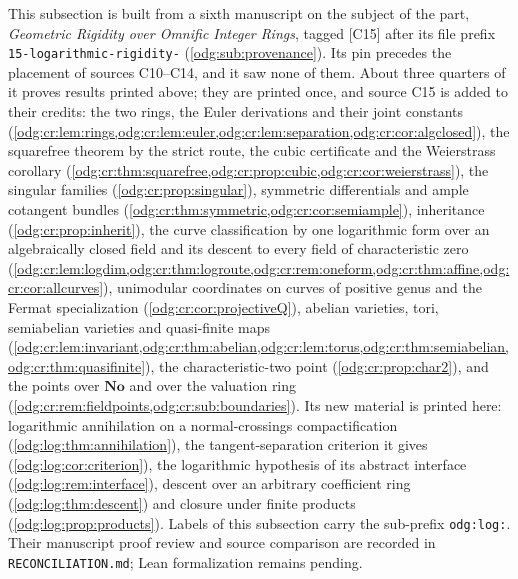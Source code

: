 \documentclass[11pt,oneside]{article}
\numberwithin{equation}{section}
\theoremstyle{definition}
\theoremstyle{remark}
\newcommand{\No}{\mathbf{No}}
\newcommand{\src}[1]{\textup{\textsf{\small[#1]}}}
\newcommand{\fn}[1]{\nolinkurl{#1}}
\begin{document}
This subsection is built from a sixth manuscript on the subject of the part,
\emph{Geometric Rigidity over Omnific Integer Rings}, tagged \src{C15} after its
file prefix \fn{15-logarithmic-rigidity-} (\cref{odg:sub:provenance}). Its pin
precedes the placement of sources C10--C14, and it saw none of them. About three
quarters of it proves results printed above; they are printed once, and source C15
is added to their credits: the two rings, the Euler derivations and their joint
constants (\cref{odg:cr:lem:rings,odg:cr:lem:euler,odg:cr:lem:separation,odg:cr:cor:algclosed}),
the squarefree theorem by the strict route, the cubic certificate and the
Weierstrass corollary (\cref{odg:cr:thm:squarefree,odg:cr:prop:cubic,odg:cr:cor:weierstrass}),
the singular families (\cref{odg:cr:prop:singular}), symmetric differentials and
ample cotangent bundles (\cref{odg:cr:thm:symmetric,odg:cr:cor:semiample}),
inheritance (\cref{odg:cr:prop:inherit}), the curve classification by one
logarithmic form over an algebraically closed field and its descent to every field
of characteristic zero
(\cref{odg:cr:lem:logdim,odg:cr:thm:logroute,odg:cr:rem:oneform,odg:cr:thm:affine,odg:cr:cor:allcurves}),
unimodular coordinates on curves of positive genus and the Fermat specialization
(\cref{odg:cr:cor:projectiveQ}), abelian varieties, tori, semiabelian varieties and
quasi-finite maps
(\cref{odg:cr:lem:invariant,odg:cr:thm:abelian,odg:cr:lem:torus,odg:cr:thm:semiabelian,odg:cr:thm:quasifinite}),
the characteristic-two point (\cref{odg:cr:prop:char2}), and the points over $\No$
and over the valuation ring (\cref{odg:cr:rem:fieldpoints,odg:cr:sub:boundaries}).
Its new material is printed here: logarithmic annihilation on a normal-crossings
compactification (\cref{odg:log:thm:annihilation}), the tangent-separation criterion
it gives (\cref{odg:log:cor:criterion}), the logarithmic hypothesis of its abstract
interface (\cref{odg:log:rem:interface}), descent over an arbitrary coefficient ring
(\cref{odg:log:thm:descent}) and closure under finite products
(\cref{odg:log:prop:products}). Labels of this subsection carry the sub-prefix
\fn{odg:log:}. Their manuscript proof review and source comparison are recorded in
\fn{RECONCILIATION.md}; Lean formalization remains pending.
\end{document}
